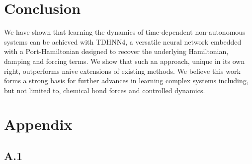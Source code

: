 \documentclass[twoside]{article}
\begin{document}
\section{Conclusion}

We have shown that learning the dynamics of time-dependent non-autonomous systems can be achieved with TDHNN4, a versatile neural network embedded with a Port-Hamiltonian designed to recover the underlying Hamiltonian, damping and forcing terms. We show that such an approach, unique in its own right, outperforms naive extensions of existing methods. We believe this work forms a strong basis for further advances in learning complex systems including, but not limited to, chemical bond forces and controlled dynamics. 


\pagebreak



\onecolumn
\section*{Appendix}

\subsection*{A.1}
\end{document}
